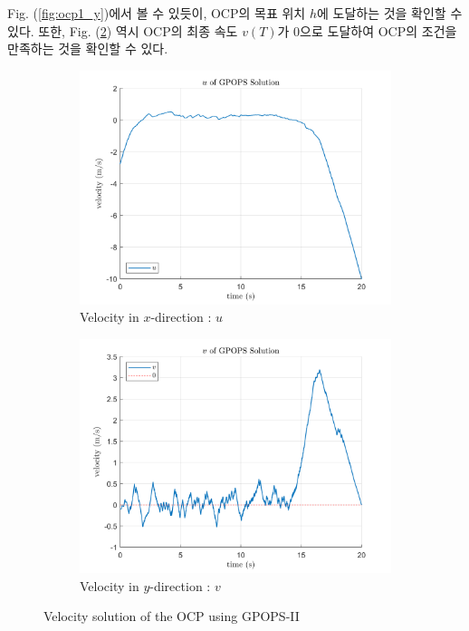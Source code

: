 Fig. (\ref{fig:ocp1_y})에서 볼 수 있듯이, OCP의 목표 위치 $h$에 도달하는 것을 확인할 수 있다.
또한, Fig. (\ref{fig:ocp1_v}) 역시 OCP의 최종 속도 $v(T)$가 0으로 도달하여 OCP의 조건을 만족하는 것을 확인할 수 있다.

\begin{figure}[ht]
	\centering
	\begin{subfigure}[b]{0.49\linewidth}
		\includegraphics[width=\linewidth]{figures/SolU.png}
		\caption{Velocity in $x$-direction : $u$}
		\label{fig:ocp1_u}
	\end{subfigure}
	\hfill
	\begin{subfigure}[b]{0.49\linewidth}
		\includegraphics[width=\linewidth]{figures/SolV.png}
		\caption{Velocity in $y$-direction : $v$}
		\label{fig:ocp1_v}
	\end{subfigure}
	\caption{Velocity solution of the OCP using GPOPS-II}
	\label{fig:ocp1_vel}
\end{figure}

